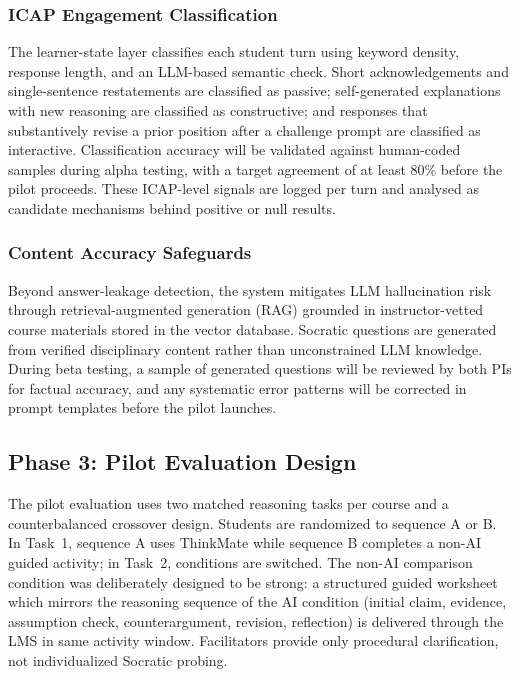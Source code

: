 \documentclass[11pt,a4paper]{article}
\begin{document}
\subsubsection*{ICAP Engagement Classification}

The learner-state layer classifies each student turn using keyword density, response length, and an LLM-based semantic check. Short acknowledgements and single-sentence restatements are classified as passive; self-generated explanations with new reasoning are classified as constructive; and responses that substantively revise a prior position after a challenge prompt are classified as interactive. Classification accuracy will be validated against human-coded samples during alpha testing, with a target agreement of at least 80\% before the pilot proceeds. These ICAP-level signals are logged per turn and analysed as candidate mechanisms behind positive or null results.

\subsubsection*{Content Accuracy Safeguards}

Beyond answer-leakage detection, the system mitigates LLM hallucination risk through retrieval-augmented generation (RAG) grounded in instructor-vetted course materials stored in the vector database. Socratic questions are generated from verified disciplinary content rather than unconstrained LLM knowledge. During beta testing, a sample of generated questions will be reviewed by both PIs for factual accuracy, and any systematic error patterns will be corrected in prompt templates before the pilot launches.

\subsection*{Phase 3: Pilot Evaluation Design}

The pilot evaluation uses two matched reasoning tasks per course and a counterbalanced crossover design. Students are randomized to sequence A or B. In Task~1, sequence A uses ThinkMate while sequence B completes a non-AI guided activity; in Task~2, conditions are switched. The non-AI comparison condition was deliberately designed to be strong: a structured guided worksheet which mirrors the reasoning sequence of the AI condition (initial claim, evidence, assumption check, counterargument, revision, reflection) is delivered through the LMS in same activity window. Facilitators provide only procedural clarification, not individualized Socratic probing.
\end{document}
